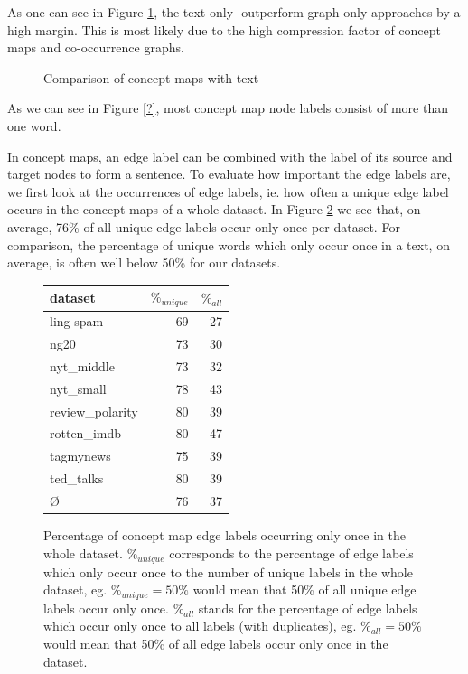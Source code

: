 As one can see in Figure \ref{fig:results_cmap_vs_text}, the text-only- outperform graph-only approaches by a high margin.
This is most likely due to the high compression factor of concept maps and co-occurrence graphs.

\begin{figure}[htb!]
\centering
\missingfigure[figcolor=white]{}
\caption{Comparison of concept maps with text}
\label{fig:results_cmap_vs_text}
\end{figure}

As we can see in Figure \ref{?}, most concept map node labels consist of more than one word. 


In concept maps, an edge label can be combined with the label of its source and target nodes to form a sentence.
To evaluate how important the edge labels are, we first look at the occurrences of edge labels, ie. how often a unique edge label occurs in the concept maps of a whole dataset.
In Figure \ref{fig:edge_label_occurrences} we see that, on average, 76\% of all unique edge labels occur only once per dataset. For comparison, the percentage of unique words which only occur once in a text, on average, is often well below 50\% for our datasets.

\begin{figure}[htb!]
	\centering
	\begin{tabular}{lrr}
		dataset &  $ \%_{unique} $ & $ \%_{all}$  \\
		\midrule
		ling-spam       & 69 & 27 \\
		ng20            & 73 & 30 \\
		nyt\_middle      & 73 & 32 \\
		nyt\_small       & 78 & 43 \\
		review\_polarity & 80 & 39 \\
		rotten\_imdb     & 80 & 47 \\
		tagmynews       & 75 & 39 \\
		ted\_talks       & 80 & 39 \\
		\midrule
		\O           & 76 & 37 \\
		\bottomrule
	\end{tabular}
	\caption{Percentage of concept map edge labels occurring only once in the whole dataset.
		$ \%_{unique} $ corresponds to the percentage of edge labels which only occur once to the number of unique labels in the whole dataset, eg. $ \%_{unique} = 50\% $ would mean that 50\% of all unique edge labels occur only once.
		$ \%_{all}$ stands for the percentage of edge labels which occur only once to all labels (with duplicates), eg. $ \%_{all} = 50\%$ would mean that 50\% of all edge labels occur only once in the dataset.}\label{fig:edge_label_occurrences}
\end{figure}

